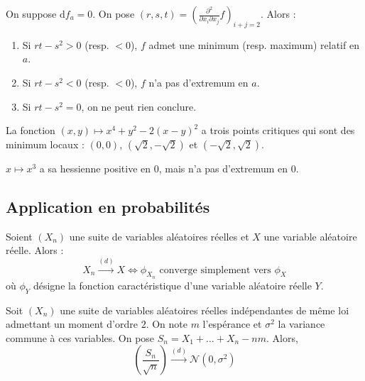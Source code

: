   \begin{example}
    On suppose $\mathrm{d}f_a = 0$. On pose $(r,s,t) = \left(  \frac{\partial^2}{\partial x_i \partial x_j} f \right)_{i+j=2}$. Alors :
    \begin{enumerate}[label=(\roman*)]
      \item Si $rt-s^2 > 0$ (resp. $< 0$), $f$ admet une minimum (resp. maximum) relatif en $a$.
      \item Si $rt-s^2 < 0$ (resp. $< 0$), $f$ n'a pas d'extremum en $a$.
      \item Si $rt-s^2 = 0$, on ne peut rien conclure.
    \end{enumerate}
  \end{example}

  \begin{example}
    La fonction $(x,y) \mapsto x^4 + y^2 - 2(x-y)^2$ a trois points critiques qui sont des minimum locaux : $(0,0)$, $(\sqrt{2},-\sqrt{2})$ et $(-\sqrt{2},\sqrt{2})$.
  \end{example}

  \begin{cexample}
    $x \mapsto x^3$ a sa hessienne positive en $0$, mais n'a pas d'extremum en $0$.
  \end{cexample}

  \subsection{Application en probabilités}


  \begin{theorem}[Lévy]
    Soient $(X_n)$ une suite de variables aléatoires réelles et $X$ une variable aléatoire réelle. Alors :
    \[ X_n \overset{(d)}{\longrightarrow} X \iff \phi_{X_n} \text{ converge simplement vers } \phi_X \]
    où $\phi_Y$ désigne la fonction caractéristique d'une variable aléatoire réelle $Y$.
  \end{theorem}


  \begin{theorem}
    Soit $(X_n)$ une suite de variables aléatoires réelles indépendantes de même loi admettant un moment d'ordre $2$. On note $m$ l'espérance et $\sigma^2$ la variance commune à ces variables. On pose $S_n = X_1 + \dots + X_n - nm$. Alors,
    \[ \left ( \frac{S_n}{\sqrt{n}} \right) \overset{(d)}{\longrightarrow} \mathcal{N}(0, \sigma^2) \]
  \end{theorem}

